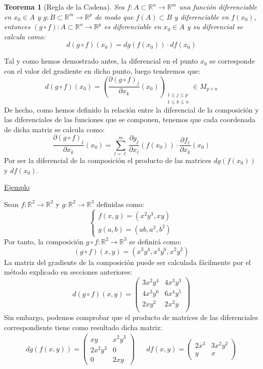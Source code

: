 \documentclass[10pt,a4paper,openright]{book}
\theoremstyle{break}
\newtheorem*{theo}{Teorema}
\begin{document}
\begin{theo}[Regla de la Cadena]
Sea $f: A \subset \mathbb{R}^n \to \mathbb{R}^m$ una función diferenciable en $x_0 \in A$ y $g: B \subset \mathbb{R}^m \to \mathbb{R}^p$ de modo que $f(A) \subset B$ y diferenciable en $f(x_0)$, entonces $\left(g \circ f\right) : A \subset \mathbb{R}^n \to \mathbb{R}^p$ es diferenciable en $x_0 \in A$ y su diferencial se calcula como:
$$d(g \circ f)(x_0) = dg(f(x_0)) \cdot df(x_0)$$
\end{theo}

Tal y como hemos demostrado antes, la diferencial en el punto $x_0$ se corresponde con el valor del gradiente en dicho punto, luego tendremos que:
$$d(g \circ f)(x_0) = \left( \frac{\partial (g \circ f)_j}{\partial x_k} (x_0) \right)_{\substack{1 \leq j \leq p \\ 1 \leq k \leq n
}}\in M_{p \times n}$$
De hecho, como hemos definido la relación entre la diferencial de la composición y las diferenciales de las funciones que se componen, tenemos que cada coordenada de dicha matriz se calcula como:
$$\frac{\partial (g \circ f)_j}{\partial x_k} (x_0) = \sum_{l = \ell}^{m} \frac{\partial g_j}{\partial x_\ell} (f(x_0)) \cdot \frac{\partial f_\ell}{\partial x_k}(x_0)$$
Por ser la diferencial de la composición el producto de las matrices $dg(f(x_0))$ y $df(x_0)$.

\underline{Ejemplo}

Sean $f: \mathbb{R}^2 \to \mathbb{R}^2$ y $g: \mathbb{R}^2 \to \mathbb{R}^3$ definidas como:
$$\begin{cases} f(x,y) = (x^2 y^3, xy) \\ g(a,b) = (ab, a^2, b^2)\end{cases}$$
Por tanto, la composición $g \circ f: \mathbb{R}^2 \to \mathbb{R}^3$
se definirá como:
$$\left(g\circ f \right)(x,y) = (x^3y^4, x^4y^6,x^2y^2)$$
La matriz del gradiente de la composición puede ser calculada fácilmente por el método explicado en secciones anteriores:
$$d(g \circ f) (x,y) = \begin{pmatrix} 3x^2y^4 & 4x^3y^3  \\ 4x^3y^6 & 6x^4y^5  \\ 2xy^2 & 2x^2y \\\end{pmatrix}$$
Sin embargo, podemos comprobar que el producto de matrices de las diferenciales correspondiente tiene como resultado dicha matriz:
\begin{align*}
d g (f(x,y)) = \begin{pmatrix}
xy & x^2 y^3 \\ 2x^2y^3 & 0 \\ 0 & 2xy
\end{pmatrix} & &
df(x,y) = \begin{pmatrix}
2x^3 & 3x^2y^2 \\ y & x
\end{pmatrix}
\end{align*}
\end{document}

